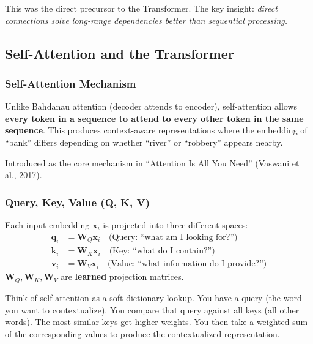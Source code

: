 \documentclass[11pt, a4paper]{article}
\begin{document}
This was the direct precursor to the Transformer. The key insight: \textit{direct connections solve long-range dependencies better than sequential processing.}

\subsection{Self-Attention and the Transformer}

\subsubsection{Self-Attention Mechanism}

\begin{defbox}
Unlike Bahdanau attention (decoder attends to encoder), self-attention allows \textbf{every token in a sequence to attend to every other token in the same sequence}. This produces context-aware representations where the embedding of ``bank'' differs depending on whether ``river'' or ``robbery'' appears nearby.

Introduced as the core mechanism in ``Attention Is All You Need'' (Vaswani et al., 2017).
\end{defbox}

\subsubsection{Query, Key, Value (Q, K, V)}

\begin{defbox}
Each input embedding $\mathbf{x}_i$ is projected into three different spaces:
\begin{align}
\mathbf{q}_i &= \mathbf{W}_Q \mathbf{x}_i \quad \text{(Query: ``what am I looking for?'')} \\
\mathbf{k}_i &= \mathbf{W}_K \mathbf{x}_i \quad \text{(Key: ``what do I contain?'')} \\
\mathbf{v}_i &= \mathbf{W}_V \mathbf{x}_i \quad \text{(Value: ``what information do I provide?'')}
\end{align}
$\mathbf{W}_Q, \mathbf{W}_K, \mathbf{W}_V$ are \textbf{learned} projection matrices.
\end{defbox}

\begin{exbox}
Think of self-attention as a soft dictionary lookup. You have a query (the word you want to contextualize). You compare that query against all keys (all other words). The most similar keys get higher weights. You then take a weighted sum of the corresponding values to produce the contextualized representation.
\end{exbox}
\end{document}
